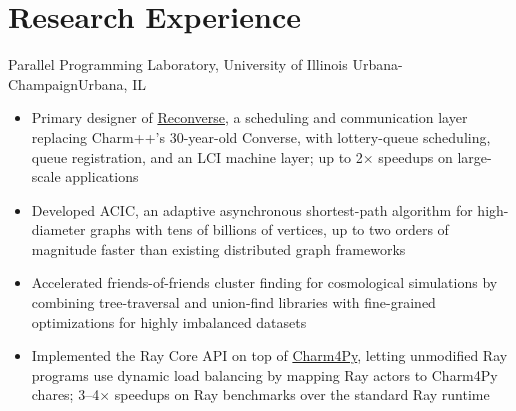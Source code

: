 \section{Research Experience}

  {Parallel Programming Laboratory, University of Illinois Urbana-Champaign}{Urbana, IL}
\begin{itemize}
  \item Primary designer of \href{https://github.com/charmplusplus/reconverse}{Reconverse},
    a scheduling and communication layer replacing Charm++'s 30-year-old Converse, with
    lottery-queue scheduling, queue registration, and an LCI machine layer; up to
    2$\times$ speedups on large-scale applications
  \item Developed ACIC, an adaptive asynchronous shortest-path algorithm for high-diameter
    graphs with tens of billions of vertices, up to two orders of magnitude faster than
    existing distributed graph frameworks
  \item Accelerated friends-of-friends cluster finding for cosmological simulations by
    combining tree-traversal and union-find libraries with fine-grained optimizations
    for highly imbalanced datasets
  \item Implemented the Ray Core API on top of
    \href{https://github.com/charmplusplus/charm4py}{Charm4Py}, letting unmodified Ray
    programs use dynamic load balancing by mapping Ray actors to Charm4Py chares;
    3--4$\times$ speedups on Ray benchmarks over the standard Ray runtime
\end{itemize}
